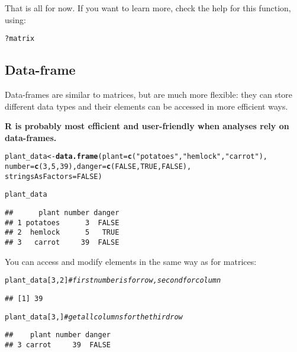 \documentclass[12pt,a4paper]{scrartcl}\usepackage[]{graphicx}\usepackage[]{color}
\makeatletter
\newcommand{\hlnum}[1]{\textcolor[rgb]{0.686,0.059,0.569}{#1}}%
\newcommand{\hlstr}[1]{\textcolor[rgb]{0.192,0.494,0.8}{#1}}%
\newcommand{\hlcom}[1]{\textcolor[rgb]{0.678,0.584,0.686}{\textit{#1}}}%
\newcommand{\hlopt}[1]{\textcolor[rgb]{0,0,0}{#1}}%
\newcommand{\hlstd}[1]{\textcolor[rgb]{0.345,0.345,0.345}{#1}}%
\newcommand{\hlkwb}[1]{\textcolor[rgb]{0.69,0.353,0.396}{#1}}%
\newcommand{\hlkwc}[1]{\textcolor[rgb]{0.333,0.667,0.333}{#1}}%
\newcommand{\hlkwd}[1]{\textcolor[rgb]{0.737,0.353,0.396}{\textbf{#1}}}%
\newenvironment{kframe}{%
 \def\at@end@of@kframe{}%
 \ifinner\ifhmode%
  \def\at@end@of@kframe{\end{minipage}}%
  \begin{minipage}{\columnwidth}%
 \fi\fi%
 \def\FrameCommand##1{\hskip\@totalleftmargin \hskip-\fboxsep
 \colorbox{shadecolor}{##1}\hskip-\fboxsep
     \hskip-\linewidth \hskip-\@totalleftmargin \hskip\columnwidth}%
 \MakeFramed {\advance\hsize-\width
   \@totalleftmargin\z@ \linewidth\hsize
   \@setminipage}}%
 {\par\unskip\endMakeFramed%
 \at@end@of@kframe}
\newenvironment{knitrout}{}{} %
\makeatother
\begin{document}
That is all for now. If you want to learn more, check the help for this function, using:
\begin{knitrout}
\color{fgcolor}\begin{kframe}
\begin{alltt}
\hlopt{?}\hlstd{matrix}
\end{alltt}
\end{kframe}
\end{knitrout}

\subsection{Data-frame}
Data-frames are similar to matrices, but are much more flexible: they can store different data types and their elements can be accessed in more efficient ways.

\textbf{R is probably most efficient and user-friendly when analyses rely on data-frames.}


\begin{knitrout}
\color{fgcolor}\begin{kframe}
\begin{alltt}
\hlstd{plant_data} \hlkwb{<-} \hlkwd{data.frame}\hlstd{(}\hlkwc{plant} \hlstd{=} \hlkwd{c}\hlstd{(}\hlstr{"potatoes"}\hlstd{,} \hlstr{"hemlock"}\hlstd{,} \hlstr{"carrot"}\hlstd{),}
                         \hlkwc{number}\hlstd{=} \hlkwd{c}\hlstd{(}\hlnum{3}\hlstd{,}\hlnum{5}\hlstd{,}\hlnum{39}\hlstd{),} \hlkwc{danger}\hlstd{=} \hlkwd{c}\hlstd{(}\hlnum{FALSE}\hlstd{,}\hlnum{TRUE}\hlstd{,}\hlnum{FALSE}\hlstd{),}
                         \hlkwc{stringsAsFactors} \hlstd{=} \hlnum{FALSE}\hlstd{)}

\hlstd{plant_data}
\end{alltt}
\begin{verbatim}
##      plant number danger
## 1 potatoes      3  FALSE
## 2  hemlock      5   TRUE
## 3   carrot     39  FALSE
\end{verbatim}
\end{kframe}
\end{knitrout}

You can access and modify elements in the same way as for matrices:
\begin{knitrout}
\color{fgcolor}\begin{kframe}
\begin{alltt}
\hlstd{plant_data[}\hlnum{3}\hlstd{,}\hlnum{2}\hlstd{]} \hlcom{#first number is for row, second for column}
\end{alltt}
\begin{verbatim}
## [1] 39
\end{verbatim}
\begin{alltt}
\hlstd{plant_data[}\hlnum{3}\hlstd{,]} \hlcom{#get all columns for the third row}
\end{alltt}
\begin{verbatim}
##    plant number danger
## 3 carrot     39  FALSE
\end{verbatim}
\end{kframe}
\end{knitrout}
\end{document}

